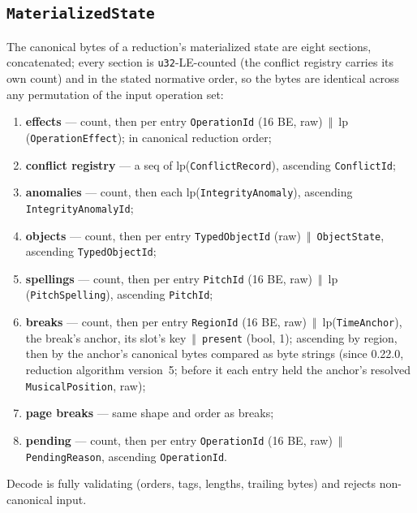 \documentclass[11pt,letterpaper]{report}
\newcommand{\cat}{\ensuremath{\,\Vert\,}}
\begin{document}
\subsection{\texttt{MaterializedState}}
\label{sec:ops:materialized}

The canonical bytes of a reduction's materialized state are eight sections,
concatenated; every section is \texttt{u32}-LE-counted (the conflict
registry carries its own count) and in the stated normative order, so the
bytes are identical across any permutation of the input operation set:

\begin{enumerate}
  \item \textbf{effects} --- count, then per entry \texttt{OperationId}
    (16 BE, raw) \cat{} $\mathrm{lp}$(\texttt{OperationEffect}); in
    canonical reduction order;
  \item \textbf{conflict registry} --- a seq of
    $\mathrm{lp}$(\texttt{ConflictRecord}), ascending \texttt{ConflictId};
  \item \textbf{anomalies} --- count, then each
    $\mathrm{lp}$(\texttt{IntegrityAnomaly}), ascending
    \texttt{IntegrityAnomalyId};
  \item \textbf{objects} --- count, then per entry \texttt{TypedObjectId}
    (raw) \cat{} \texttt{ObjectState}, ascending \texttt{TypedObjectId};
  \item \textbf{spellings} --- count, then per entry \texttt{PitchId}
    (16 BE, raw) \cat{} $\mathrm{lp}$(\texttt{PitchSpelling}), ascending
    \texttt{PitchId};
  \item \textbf{breaks} --- count, then per entry \texttt{RegionId}
    (16 BE, raw) \cat{} $\mathrm{lp}$(\texttt{TimeAnchor}), the break's
    anchor, its slot's key \cat{} \texttt{present} (bool, 1); ascending by
    region, then by the anchor's canonical bytes compared as byte strings
    (since 0.22.0, reduction algorithm version~5; before it each entry held
    the anchor's resolved \texttt{MusicalPosition}, raw);
  \item \textbf{page breaks} --- same shape and order as breaks;
  \item \textbf{pending} --- count, then per entry \texttt{OperationId}
    (16 BE, raw) \cat{} \texttt{PendingReason}, ascending
    \texttt{OperationId}.
\end{enumerate}

Decode is fully validating (orders, tags, lengths, trailing bytes) and
rejects non-canonical input.
\end{document}
